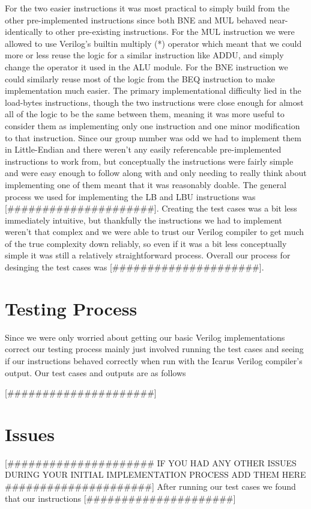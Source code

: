 \documentclass[acmtog]{acmart}
\begin{document}
For the two easier instructions it was most practical to simply build from the other pre-implemented instructions since both BNE and MUL behaved near-identically to other pre-existing instructions. For the MUL instruction we were allowed to use Verilog's builtin multiply (*) operator which meant that we could more or less reuse the logic for a similar instruction like ADDU, and simply change the operator it used in the ALU module. For the BNE instruction we could similarly reuse most of the logic from the BEQ instruction to make implementation much easier. The primary implementational difficulty lied in the load-bytes instructions, though the two instructions were close enough for almost all of the logic to be the same between them, meaning it was more useful to consider them as implementing only one instruction and one minor modification to that instruction. Since our group number was odd we had to implement them in Little-Endian and there weren't any easily referencable pre-implemented instructions to work from, but conceptually the instructions were fairly simple and were easy enough to follow along with and only needing to really think about implementing one of them meant that it was reasonably doable. The general process we used for implementing the LB and LBU instructions was [\#\#\#\#\#\#\#\#\#\#\#\#\#\#\#\#\#\#\#\#\#]. Creating the test cases was a bit less immediately intuitive, but thankfully the instructions we had to implement weren't that complex and we were able to trust our Verilog compiler to get much of the true complexity down reliably, so even if it was a bit less conceptually simple it was still a relatively straightforward process. Overall our process for desinging the test cases was [\#\#\#\#\#\#\#\#\#\#\#\#\#\#\#\#\#\#\#\#\#].
\section{Testing Process}
  Since we were only worried about getting our basic Verilog implementations correct our testing process mainly just involved running the test cases and seeing if our instructions behaved correctly when run with the Icarus Verilog compiler's output. Our test cases and outputs are as follows
  
  [\#\#\#\#\#\#\#\#\#\#\#\#\#\#\#\#\#\#\#\#\#]
\section{Issues}
  [\#\#\#\#\#\#\#\#\#\#\#\#\#\#\#\#\#\#\#\#\# IF YOU HAD ANY OTHER ISSUES DURING YOUR INITIAL IMPLEMENTATION PROCESS ADD THEM HERE \#\#\#\#\#\#\#\#\#\#\#\#\#\#\#\#\#\#\#\#\#]
  After running our test cases we found that our instructions [\#\#\#\#\#\#\#\#\#\#\#\#\#\#\#\#\#\#\#\#\#]
\end{document}

